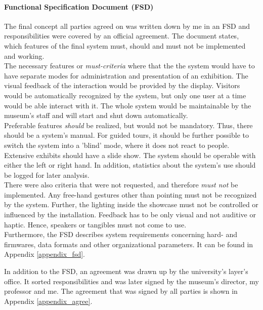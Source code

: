\paragraph{Functional Specification Document (\ac{FSD})} The final concept all parties agreed on was written down by me in an \ac{FSD} and responsibilities were covered by an official agreement. The document states, which features of the final system must, should and must not be implemented and working.
\\
The necessary features or \textit{must-criteria} where that the the system would have to have separate modes for administration and presentation of an exhibition. The visual feedback of the interaction would be provided by the display. Visitors would be automatically recognized by the system, but only one user at a time would be able interact with it. The whole system would be maintainable by the museum's staff and will start and shut down automatically.
\\
Preferable features \textit{should} be realized, but would not be mandatory. Thus, there should be a system's manual. For guided tours, it should be further possible to switch the system into a 'blind' mode, where it does not react to people. Extensive exhibits should have a slide show. The system should be operable with either the left or right hand. In addition, statistics about the system's use should be logged for later analysis.
\\
There were also criteria that were not requested, and therefore \textit{must not} be implemented. Any free-hand gestures other than pointing must not be recognized by the system. Further, the lighting inside the showcase must not be controlled or influenced by the installation. Feedback has to be only visual and not auditive or haptic. Hence, speakers or tangibles must not come to use. 
\\
Furthermore, the \ac{FSD} describes system requirements concerning hard- and firmwares, data formats and other organizational parameters. It can be found in Appendix \ref{appendix_fsd}.

In addition to the \ac{FSD}, an agreement was drawn up by the university's layer's office. It sorted responsibilities and was later signed by the museum's director, my professor and me. The agreement that was signed by all parties is shown in Appendix \ref{appendix_agree}.

